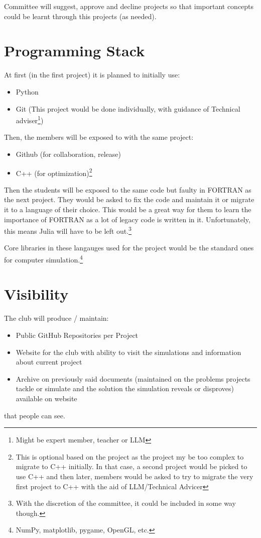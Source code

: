 \documentclass{article}
\begin{document}
Committee will suggest, approve and decline projects so that important concepts could be learnt through this projects (as needed).

\section{Programming Stack}
At first (in the first project) it is planned to initially use:
\begin{itemize}
\item Python
\item Git (This project would be done individually, with guidance of Technical adviser\footnote{Might be expert member, teacher or LLM})
\end{itemize}

Then, the members will be exposed to with the same project:
\begin{itemize}
\item Github (for collaboration, release)
\item C++ (for optimization)\footnote{This is optional based on the project as the project my be too complex to migrate to C++ initially. In that case, a second project would be picked to use C++ and then later, members would be asked to try to migrate the very first project to C++ with the aid of LLM/Technical Advicer}
\end{itemize}

Then the students will be exposed to the same code but faulty in FORTRAN as the next project. They would be asked to fix the code and maintain it or migrate it to a language of their choice. This would be a great way for them to learn the importance of FORTRAN as a lot of legacy code is written in it. Unfortunately, this means Julia will have to be left out.\footnote{With the discretion of the committee, it could be included in some way though.}

Core libraries in these langauges used for the project would be the standard ones for computer simulation.\footnote{NumPy, matplotlib, pygame, OpenGL, etc.}

\section{Visibility}

The club will produce / maintain:
\begin{itemize}
\item Public GitHub Repositories per Project
\item Website for the club with ability to visit the simulations and information about current project
\item Archive on previously said documents (maintained on the problems projects tackle or simulate and the solution the simulation reveals or disproves) available on website
\end{itemize}
that people can see.
\end{document}
